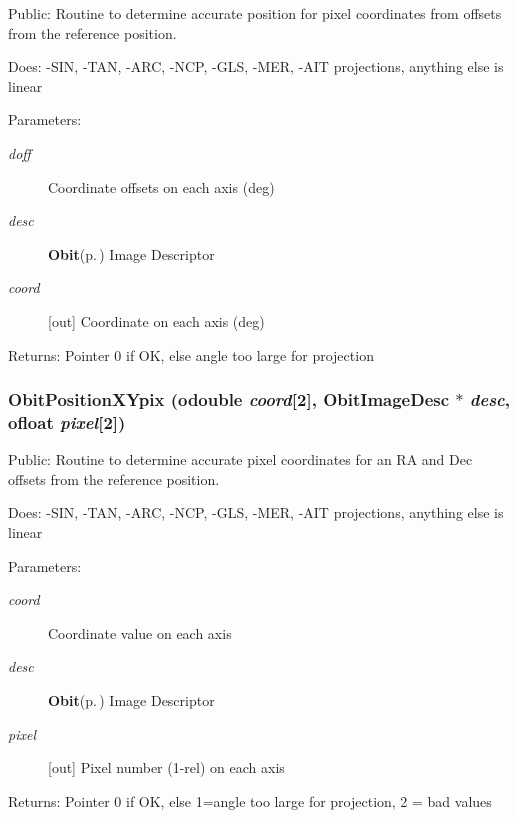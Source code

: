 Public: Routine to determine accurate position for pixel coordinates from offsets from the reference position. 

Does: -SIN, -TAN, -ARC, -NCP, -GLS, -MER, -AIT projections, anything else is linear

\begin{Desc}
\item[Parameters:]
\begin{description}
\item[{\em doff}]Coordinate offsets on each axis (deg) \item[{\em desc}]{\bf Obit}{\rm (p.\,\pageref{structObit})} Image Descriptor \item[{\em coord}][out] Coordinate on each axis (deg) \end{description}
\end{Desc}
\begin{Desc}
\item[Returns:]Pointer 0 if OK, else angle too large for projection \end{Desc}
\subsubsection{ Obit\-Position\-XYpix ({\bf odouble} {\em coord}[2], {\bf Obit\-Image\-Desc} $\ast$ {\em desc}, {\bf ofloat} {\em pixel}[2])}\label{ObitPosition_8h_a1}


Public: Routine to determine accurate pixel coordinates for an RA and Dec offsets from the reference position. 

Does: -SIN, -TAN, -ARC, -NCP, -GLS, -MER, -AIT projections, anything else is linear

\begin{Desc}
\item[Parameters:]
\begin{description}
\item[{\em coord}]Coordinate value on each axis \item[{\em desc}]{\bf Obit}{\rm (p.\,\pageref{structObit})} Image Descriptor \item[{\em pixel}][out] Pixel number (1-rel) on each axis \end{description}
\end{Desc}
\begin{Desc}
\item[Returns:]Pointer 0 if OK, else 1=angle too large for projection, 2 = bad values \end{Desc}
